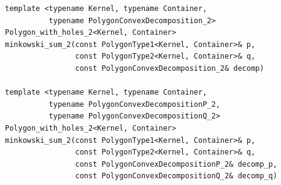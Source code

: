 \begin{lstfloat}
\begin{lstlisting}[style=cppframedStyle,basicstyle=\scriptsize,%
                   label={lst:minkSumConvexDecomposition},%
                   caption={Signatures of function templates that compute the 2D Minkwoski sum using the convex-decomposition approach.}]
template <typename Kernel, typename Container,
          typename PolygonConvexDecomposition_2>
Polygon_with_holes_2<Kernel, Container>
minkowski_sum_2(const PolygonType1<Kernel, Container>& p,
                const PolygonType2<Kernel, Container>& q,
                const PolygonConvexDecomposition_2& decomp)

template <typename Kernel, typename Container,
          typename PolygonConvexDecompositionP_2,
          typename PolygonConvexDecompositionQ_2>
Polygon_with_holes_2<Kernel, Container>
minkowski_sum_2(const PolygonType1<Kernel, Container>& p,
                const PolygonType2<Kernel, Container>& q,
                const PolygonConvexDecompositionP_2& decomp_p,
                const PolygonConvexDecompositionQ_2& decomp_q)
\end{lstlisting}
\end{lstfloat}


